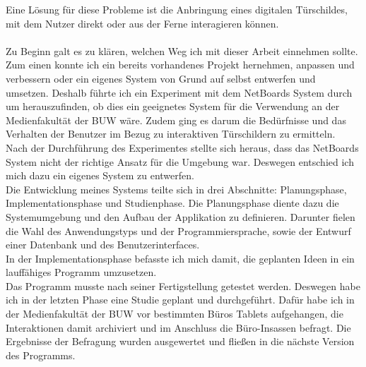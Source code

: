 Eine Lösung für diese Probleme ist die Anbringung eines digitalen Türschildes, mit dem Nutzer direkt oder aus der Ferne interagieren können.
\\
\\
Zu Beginn galt es zu klären, welchen Weg ich mit dieser Arbeit einnehmen sollte. Zum einen konnte ich ein bereits vorhandenes Projekt hernehmen, anpassen und verbessern oder ein eigenes System von Grund auf selbst entwerfen und umsetzen.
Deshalb führte ich ein Experiment mit dem NetBoards System\cite{wood:2014,netboards:website} durch um herauszufinden, ob dies ein geeignetes System für die Verwendung an der Medienfakultät der BUW wäre. Zudem ging es darum die Bedürfnisse und das Verhalten der Benutzer im Bezug zu interaktiven Türschildern zu ermitteln.\\
Nach der Durchführung des Experimentes stellte sich heraus, dass das NetBoards System nicht der richtige Ansatz für die Umgebung war. Deswegen entschied ich mich dazu ein eigenes System zu entwerfen.\\
Die Entwicklung meines Systems teilte sich in drei Abschnitte: Planungsphase, Implementationsphase und Studienphase.
Die Planungsphase diente dazu die Systemumgebung und den Aufbau der Applikation zu definieren.
Darunter fielen die Wahl des Anwendungstyps und der Programmiersprache, sowie der Entwurf einer Datenbank und des Benutzerinterfaces.\\
In der Implementationsphase befasste ich mich damit, die geplanten Ideen in ein lauffähiges Programm umzusetzen.\\
Das Programm musste nach seiner Fertigstellung getestet werden. Deswegen habe ich in der letzten Phase eine Studie geplant und durchgeführt. Dafür habe ich in der Medienfakultät der BUW vor bestimmten Büros Tablets aufgehangen, die Interaktionen damit archiviert und im Anschluss die Büro-Insassen befragt. Die Ergebnisse der Befragung wurden ausgewertet und fließen in die nächste Version des Programms.